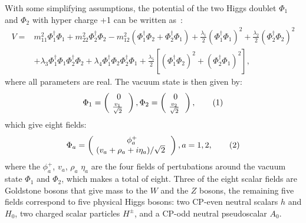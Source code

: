With some simplifying assumptions, the potential of the two Higgs doublet $\Phi_1$ and
$\Phi_2$ with hyper charge +1 can be written as~\cite{2HDM-Branco}:
\begin{align*}
    V = & m_{11}^2  \Phi_1^\dagger \Phi_1  + m_{22}^2 \Phi_2^\dagger \Phi_2 - m_{12}^2 (\Phi_1^\dagger \Phi_2 + \Phi_2^\dagger \Phi_1) + \frac{\lambda_1}{2}(\Phi_1^\dagger \Phi_1)^2 +\frac{\lambda_2}{2}(\Phi_2^\dagger \Phi_2)^2 \\
    & + \lambda_3 \Phi_1^\dagger \Phi_1 \Phi_2^\dagger \Phi_2 + \lambda_4 \Phi_1^\dagger \Phi_2 \Phi_2^\dagger \Phi_1 +  \frac{\lambda_5}{2}\left[ (\Phi_1^\dagger \Phi_2)^2 + (\Phi_2^\dagger \Phi_1)^2        \right],
\end{align*}
where all parameters are real. 
The vacuum state is then given by:
\[
\Phi_1 =     \begin{pmatrix} 
   0 \\ \ \frac{v_1}{\sqrt{2}} \  \
    \end{pmatrix}, 
\Phi_2 =     \begin{pmatrix} 
    0 \\ \ \frac{v_2}{\sqrt{2}} \  \
        \end{pmatrix}, 
\addtag \]
which give eight fields:
\[
\Phi_a = \begin{pmatrix} 
\phi_a^+ \\ \ (v_a + \rho_a + i \eta_a) /\sqrt{2} \  \
\end{pmatrix}, a = 1,2,    
\addtag \]
where the $\phi_a^+$, $v_a$, $\rho_a$ $\eta_a$ are the four fields
of pertubations around the vacuum state $\Phi_1$ and $\Phi_2$, which makes
a total of eight.  
Three of the eight scalar fields are Goldstone bosons that give mass to the $W$
and the $Z$ bosons, the remaining five fields correspond to five physical Higgs bosons:
two CP-even neutral scalars $h$ and $H_0$, two charged scalar particles $H^\pm$, and a 
CP-odd neutral pseudoscalar $A_0$. 


